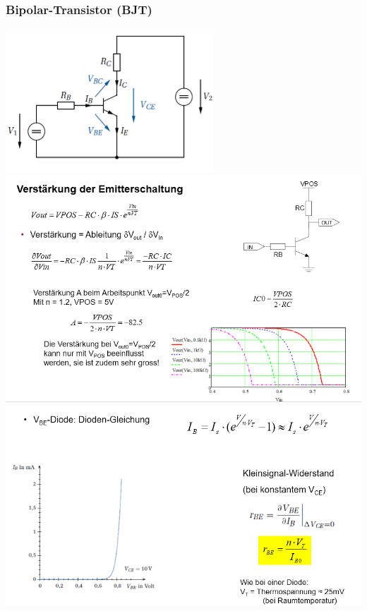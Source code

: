 \subsubsection{Bipolar-Transistor (BJT)}
\begin{center}
	\includegraphics[width=0.5\columnwidth]{Images/bipolar}\\
	\includegraphics[width=\columnwidth]{Images/bipolar-formel3}\\
	\includegraphics[width=\columnwidth]{Images/bipolar-formel}
\end{center}

